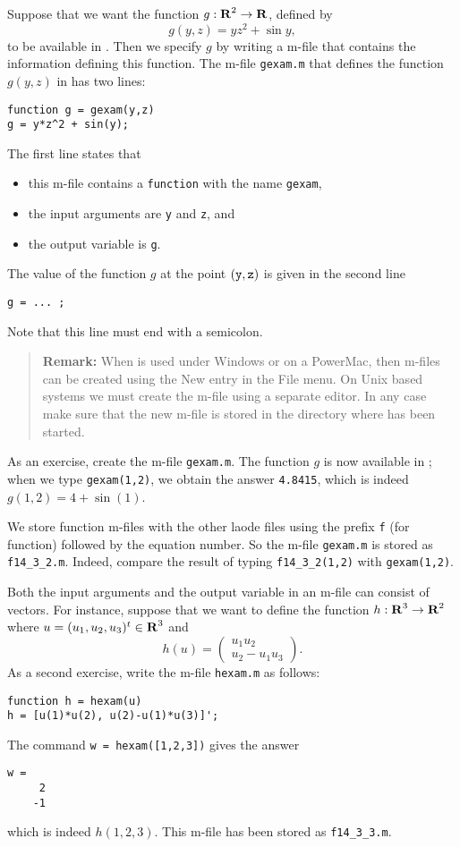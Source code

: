 \documentclass{ximera}
\begin{document}
Suppose that we want the function $g:\mbox{$\bf{R}$}^2\to\mbox{$\bf{R}$}$, defined by
\begin{equation*}  \label{eq:gexam}
g(y,z) = yz^2 + \sin y,
\end{equation*}
to be available in \Matlabp.
Then we specify $g$ by writing a \Matlab m-file that contains the information 
defining this function.  The m-file {\tt gexam.m} that defines the function 
$g(y,z)$ in  has two lines:
\begin{verbatim}
function g = gexam(y,z)
g = y*z^2 + sin(y);
\end{verbatim}
The first line states that 
\begin{itemize}
\item this m-file contains a {\tt function} with the name {\tt gexam},
\item the input arguments are {\tt y} and {\tt z}, and
\item the output variable is {\tt g}.
\end{itemize}
The value of the function $g$ at the point ${\tt (y,z)}$ is given in the 
second line 
\begin{verbatim}
g = ... ;   
\end{verbatim}
Note that this line must end with a semicolon. 
\begin{quote}
{\bf Remark:} When \Matlab is used under Windows or on a PowerMac, then 
m-files
can be created using the {\sf New} entry in the {\sf File} menu.
On Unix based systems we must create the m-file using a separate
editor.  In any case make sure that the new m-file is stored in the directory
where \Matlab has been started.
\end{quote}
As an exercise, create the m-file {\tt gexam.m}.  The function $g$ is 
now available in \Matlabp; when we type {\tt gexam(1,2)}, 
we obtain the answer \verb+4.8415+, which is indeed $g(1,2)=4+\sin(1)$.

We store function m-files with the other {\sf laode} files using the prefix
{\tt f} (for function) followed by the equation number.  So the m-file 
{\tt gexam.m} is stored as {\tt f14\_3\_2.m}.  Indeed, compare the result of 
typing {\tt f14\_3\_2(1,2)} with {\tt gexam(1,2)}.

Both the input arguments and the output variable in an m-file can consist of 
vectors.  For instance, suppose that we want to define the function 
$h:\mbox{$\bf{R}$}^3\to\mbox{$\bf{R}$}^2$ where $u=(u_1,u_2,u_3)^t\in\mbox{$\bf{R}$}^3$ and  
\begin{equation*}
h(u) = \left(\begin{array}{c} u_1 u_2\\ u_2-u_1 u_3 \end{array}\right).
\end{equation*}
As a second exercise, write the m-file {\tt hexam.m} 
as follows:
\begin{verbatim}
function h = hexam(u)
h = [u(1)*u(2), u(2)-u(1)*u(3)]';
\end{verbatim}
The command {\tt w = hexam([1,2,3])} gives the answer
\begin{verbatim}
w =
     2
    -1
\end{verbatim}
which is indeed $h(1,2,3)$.  This m-file has been stored as {\tt f14\_3\_3.m}.
\end{document}
